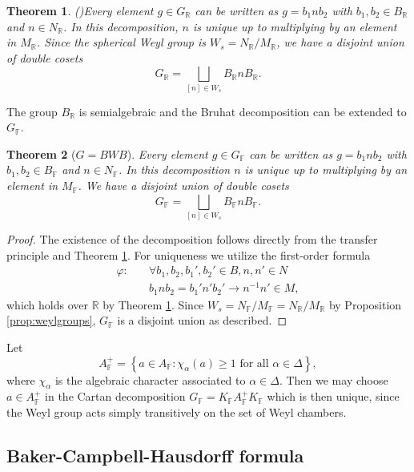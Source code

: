 \documentclass[12pt]{amsart}
\newcommand{\F}{\mathbb{F} }
\newcommand{\R}{\mathbb{R} }
\newcommand{\ApF}{A_\F^+}
\numberwithin{equation}{section}
\newtheorem{theorem}{Theorem}[section]
\theoremstyle{remark} %
\begin{document}
\begin{theorem}(\cite[Theorem 7.40]{Kna})\label{thm:BWB_R} Every element $g \in G_{\R}$ can be written as $g=b_1nb_2$ with $b_1,b_2 \in B_{\R}$ and $n \in N_{\R}$. In this decomposition, $n$ is unique up to multiplying by an element in $M_{\R}$. Since the spherical Weyl group is $W_s=N_{\R}/M_{\R}$, we have a disjoint union of double cosets
	$$
	G_{\R} = \bigsqcup_{[n] \in W_s} B_{\R}nB_{\R}.
	$$ 
\end{theorem}

The group $B_{\R}$ is semialgebraic and the Bruhat decomposition can be extended to $G_{\F}$.

\begin{theorem}[$G=BWB$]\label{thm:BWB}
	 Every element $g \in G_{\F}$ can be written as $g=b_1nb_2$ with $b_1,b_2 \in B_{\F}$ and $n \in N_{\F}$. In this decomposition $n$ is unique up to multiplying by an element in $M_{\F}$. We have a disjoint union of double cosets
	$$
	G_{\F} = \bigsqcup_{[n] \in W_s} B_{\F}nB_{\F}.
	$$ 
\end{theorem}
\begin{proof}
	The existence of the decomposition follows directly from the transfer principle and Theorem \ref{thm:BWB_R}. For uniqueness we utilize the first-order formula
	\begin{align*}
		\varphi \colon \quad &  \forall b_1,b_2,b_1',b_2' \in B, n,n' \in N \\
		& b_1nb_2 = b_1'n'b_2' \to n^{-1}n' \in M  ,
	\end{align*}
	which holds over $\R$ by Theorem \ref{thm:BWB_R}. Since $W_s= N_\F/M_\F =N_\R/M_\R$ by Proposition \ref{prop:weylgroups}, $G_\F$ is a disjoint union as described. 
\end{proof}

Let 
$$
\ApF = \left\{ a \in A_\F \colon \chi_\alpha(a) \geq 1 \text{ for all } \alpha \in \Delta \right\},
$$
where $\chi_\alpha$ is the algebraic character associated to $\alpha \in \Delta$. Then we may choose $a \in \ApF$ in the Cartan decomposition $G_\F = K_\F \ApF K_\F$ which is then unique, since the Weyl group acts simply transitively on the set of Weyl chambers.



\subsection{Baker-Campbell-Hausdorff formula}\label{sec:BCH}
\end{document}
